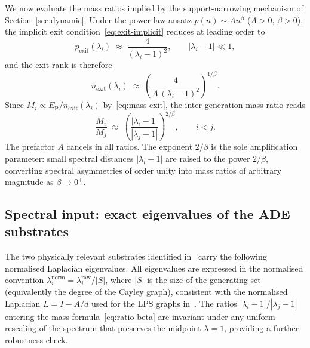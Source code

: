 \documentclass[11pt,a4paper]{article}
\newcommand{\nexit}{n_{\mathrm{exit}}}
\newcommand{\EP}{E_{\mathrm{P}}}
\begin{document}
      We now evaluate the mass ratios implied by the support-narrowing mechanism
      of Section~\ref{sec:dynamic}.
      Under the power-law ansatz $p(n) \sim A n^{\beta}$ ($A>0$, $\beta>0$),
      the implicit exit condition~\eqref{eq:exit-implicit} reduces at leading order to
      \begin{equation}
        \label{eq:pexit-leading}
        p_{\mathrm{exit}}(\lambda_i)
        \;\approx\; \frac{4}{(\lambda_i - 1)^2},
        \qquad |\lambda_i - 1| \ll 1,
      \end{equation}
      and the exit rank is therefore
      \begin{equation}
        \label{eq:nexit-powerlaw}
        \nexit(\lambda_i)
        \;\approx\; \left(\frac{4}{A\,(\lambda_i-1)^2}\right)^{1/\beta}.
      \end{equation}
      Since $M_i \propto \EP/\nexit(\lambda_i)$ by~\eqref{eq:mass-exit},
      the inter-generation mass ratio reads
      \begin{equation}
        \label{eq:ratio-beta}
        \frac{M_i}{M_j}
        \;\approx\;
        \left(\frac{|\lambda_i - 1|}{|\lambda_j - 1|}\right)^{2/\beta},
        \qquad i < j.
      \end{equation}
      The prefactor $A$ cancels in all ratios.
      The exponent $2/\beta$ is the sole amplification parameter:
      small spectral distances $|\lambda_i - 1|$ are raised to the power $2/\beta$,
      converting spectral asymmetries of order unity into mass ratios of arbitrary
      magnitude as $\beta \to 0^{+}$.

    \subsection{Spectral input: exact eigenvalues of the ADE substrates}
      \label{subsec:spectral-input}

      The two physically relevant substrates identified in~\cite{Beau2026a4}
      carry the following normalised Laplacian eigenvalues.
      All eigenvalues are expressed in the normalised convention
      $\lambda_i^{\mathrm{norm}} = \lambda_i^{\mathrm{raw}}/|S|$,
      where $|S|$ is the size of the generating set (equivalently the degree
      of the Cayley graph), consistent with the normalised Laplacian
      $L = I - A/d$ used for the LPS graphs in~\cite{Beau2026a5}.
      The ratios $|\lambda_i - 1|/|\lambda_j - 1|$ entering the mass
      formula~\eqref{eq:ratio-beta} are invariant under any uniform
      rescaling of the spectrum that preserves the midpoint $\lambda = 1$,
      providing a further robustness check.
\end{document}
